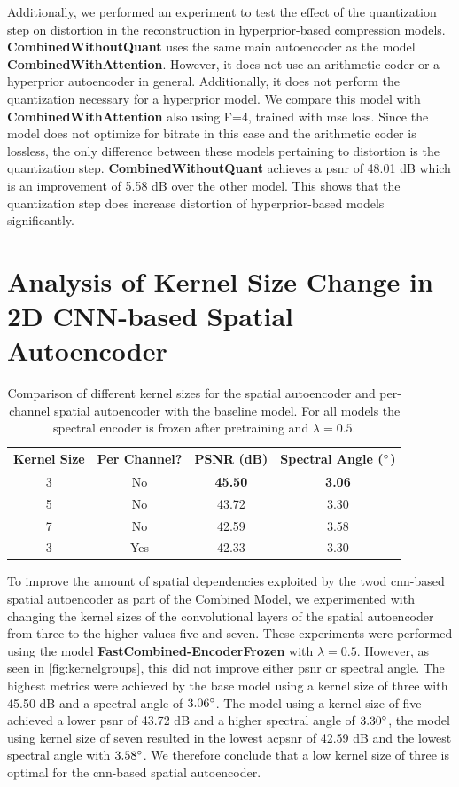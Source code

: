 Additionally, we performed an experiment to test the effect of the quantization step on distortion in the reconstruction in hyperprior-based compression models. \textbf{CombinedWithoutQuant} uses the same main autoencoder as the model \textbf{CombinedWithAttention}. However, it does not use an arithmetic coder or a hyperprior autoencoder in general. Additionally, it does not perform the quantization necessary for a hyperprior model. We compare this model with \textbf{CombinedWithAttention} also using F=4, trained with \ac{mse} loss. Since the model does not optimize for bitrate in this case and the arithmetic coder is lossless, the only difference between these models pertaining to distortion is the quantization step. \textbf{CombinedWithoutQuant} achieves a \ac{psnr} of 48.01 dB which is an improvement of 5.58 dB over the other model. This shows that the quantization step does increase distortion of hyperprior-based models significantly.

\section[Analysis of Kernel Size Change]{Analysis of Kernel Size Change in 2D CNN-based Spatial Autoencoder}
\begin{table}
\centering
\caption{Comparison of different kernel sizes for the spatial autoencoder and per-channel spatial autoencoder with the baseline model. For all models the spectral encoder is frozen after pretraining and $\lambda = 0.5$.}
\begin{tabular}{|c|c|c|c|}
\hline
Kernel Size & Per Channel? & PSNR (dB) & Spectral Angle ($\degree$) \\
\hline\hline
3 & No & \textbf{45.50} & \textbf{3.06} \\
\hline
5 & No & 43.72 & 3.30 \\
\hline
7 & No & 42.59 & 3.58 \\
\hline
3 & Yes & 42.33 & 3.30 \\
\hline
\end{tabular}
\label{fig:kernelgroups}
\end{table}

To improve the amount of spatial dependencies exploited by the \ac{twod} \ac{cnn}-based spatial autoencoder as part of the Combined Model, we experimented with changing the kernel sizes of the convolutional layers of the spatial autoencoder from three to the higher values five and seven. These experiments were performed using the model \textbf{FastCombined-EncoderFrozen} with $\lambda=0.5$. However, as seen in \autoref{fig:kernelgroups}, this did not improve either \ac{psnr} or spectral angle. The highest metrics were achieved by the base model using a kernel size of three with 45.50 dB and a spectral angle of $3.06 \degree$. The model using a kernel size of five achieved a lower \ac{psnr} of 43.72 dB and a higher spectral angle of $3.30 \degree$, the model using kernel size of seven resulted in the lowest ac{psnr} of 42.59 dB and the lowest spectral angle with $3.58 \degree$. We therefore conclude that a low kernel size of three is optimal for the \ac{cnn}-based spatial autoencoder.

